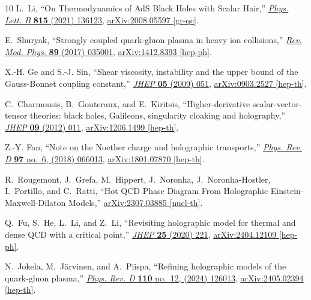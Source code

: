 \documentclass[a4paper,12pt]{article}
\numberwithin{equation}{section}
\begin{document}
\begin{thebibliography}{10}
	L.~Li, ``{On Thermodynamics of AdS Black Holes with Scalar Hair},''
	\href{http://dx.doi.org/10.1016/j.physletb.2021.136123}{{\em Phys. Lett. B}
		{\bfseries 815} (2021) 136123},
	\href{http://arxiv.org/abs/2008.05597}{{\ttfamily arXiv:2008.05597 [gr-qc]}}.
	
	E.~Shuryak, ``{Strongly coupled quark-gluon plasma in heavy ion collisions},''
	\href{http://dx.doi.org/10.1103/RevModPhys.89.035001}{{\em Rev. Mod. Phys.}
		{\bfseries 89} (2017) 035001},
	\href{http://arxiv.org/abs/1412.8393}{{\ttfamily arXiv:1412.8393 [hep-ph]}}.
	
	X.-H. Ge and S.-J. Sin, ``{Shear viscosity, instability and the upper bound of
		the Gauss-Bonnet coupling constant},''
	\href{http://dx.doi.org/10.1088/1126-6708/2009/05/051}{{\em JHEP} {\bfseries
			05} (2009) 051}, \href{http://arxiv.org/abs/0903.2527}{{\ttfamily
			arXiv:0903.2527 [hep-th]}}.
	
	C.~Charmousis, B.~Gouteraux, and E.~Kiritsis, ``{Higher-derivative
		scalar-vector-tensor theories: black holes, Galileons, singularity cloaking
		and holography},'' \href{http://dx.doi.org/10.1007/JHEP09(2012)011}{{\em
			JHEP} {\bfseries 09} (2012) 011},
	\href{http://arxiv.org/abs/1206.1499}{{\ttfamily arXiv:1206.1499 [hep-th]}}.
	
	Z.-Y. Fan, ``{Note on the Noether charge and holographic transports},''
	\href{http://dx.doi.org/10.1103/PhysRevD.97.066013}{{\em Phys. Rev. D}
		{\bfseries 97} no.~6, (2018) 066013},
	\href{http://arxiv.org/abs/1801.07870}{{\ttfamily arXiv:1801.07870
			[hep-th]}}.
	
	R.~Rougemont, J.~Grefa, M.~Hippert, J.~Noronha, J.~Noronha-Hostler,
	I.~Portillo, and C.~Ratti, ``{Hot QCD Phase Diagram From Holographic
		Einstein-Maxwell-Dilaton Models},''
	\href{http://arxiv.org/abs/2307.03885}{{\ttfamily arXiv:2307.03885
			[nucl-th]}}.
	
	Q.~Fu, S.~He, L.~Li, and Z.~Li, ``{Revisiting holographic model for thermal and
		dense QCD with a critical point},''
	\href{http://dx.doi.org/10.1007/JHEP06(2025)221}{{\em JHEP} {\bfseries 25}
		(2020) 221}, \href{http://arxiv.org/abs/2404.12109}{{\ttfamily
			arXiv:2404.12109 [hep-ph]}}.
	
	N.~Jokela, M.~J{\"a}rvinen, and A.~Piispa, ``{Refining holographic models of
		the quark-gluon plasma},''
	\href{http://dx.doi.org/10.1103/PhysRevD.110.126013}{{\em Phys. Rev. D}
		{\bfseries 110} no.~12, (2024) 126013},
	\href{http://arxiv.org/abs/2405.02394}{{\ttfamily arXiv:2405.02394
			[hep-th]}}.
	

\end{thebibliography}
\end{document}
